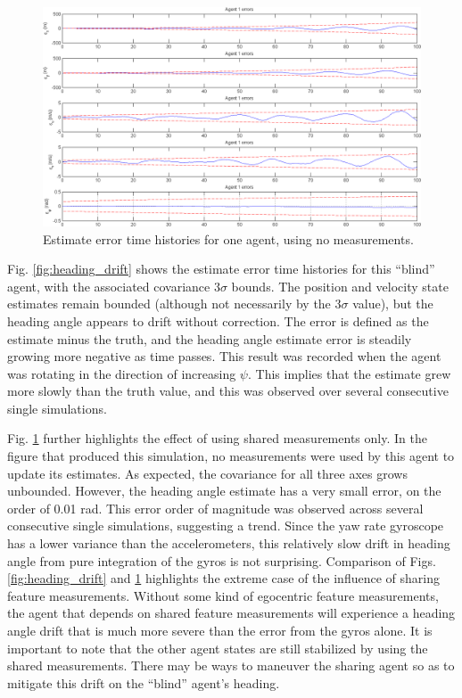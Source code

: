 \documentclass{aiaa-tc}
\begin{document}
\begin{figure}[p!]
\centering
\includegraphics[height=.4\textheight]{heading_drift_nothing.png}
\caption{Estimate error time histories for one agent, using no measurements.}
\label{fig:heading_drift_nothing}
\end{figure}

Fig. \ref{fig:heading_drift} shows the estimate error time histories for this ``blind'' agent, with the associated covariance $3\sigma$ bounds. The position and velocity state estimates remain bounded (although not necessarily by the $3\sigma$ value), but the heading angle appears to drift without correction. The error is defined as the estimate minus the truth, and the heading angle estimate error is steadily growing more negative as time passes. This result was recorded when the agent was rotating in the direction of increasing $\psi$. This implies that the estimate grew more slowly than the truth value, and this was observed over several consecutive single simulations.

Fig. \ref{fig:heading_drift_nothing} further highlights the effect of using shared measurements only. In the figure that produced this simulation, no measurements were used by this agent to update its estimates. As expected, the covariance for all three axes grows unbounded. However, the heading angle estimate has a very small error, on the order of 0.01 rad. This error order of magnitude was observed across several consecutive single simulations, suggesting a trend. Since the yaw rate gyroscope has a lower variance than the accelerometers, this relatively slow drift in heading angle from pure integration of the gyros is not surprising. Comparison of Figs. \ref{fig:heading_drift} and \ref{fig:heading_drift_nothing} highlights the extreme case of the influence of sharing feature measurements. Without some kind of egocentric feature measurements, the agent that depends on shared feature measurements will experience a heading angle drift that is much more severe than the error from the gyros alone. It is important to note that the other agent states are still stabilized by using the shared measurements. There may be ways to maneuver the sharing agent so as to mitigate this drift on the ``blind'' agent's heading.
\end{document}
